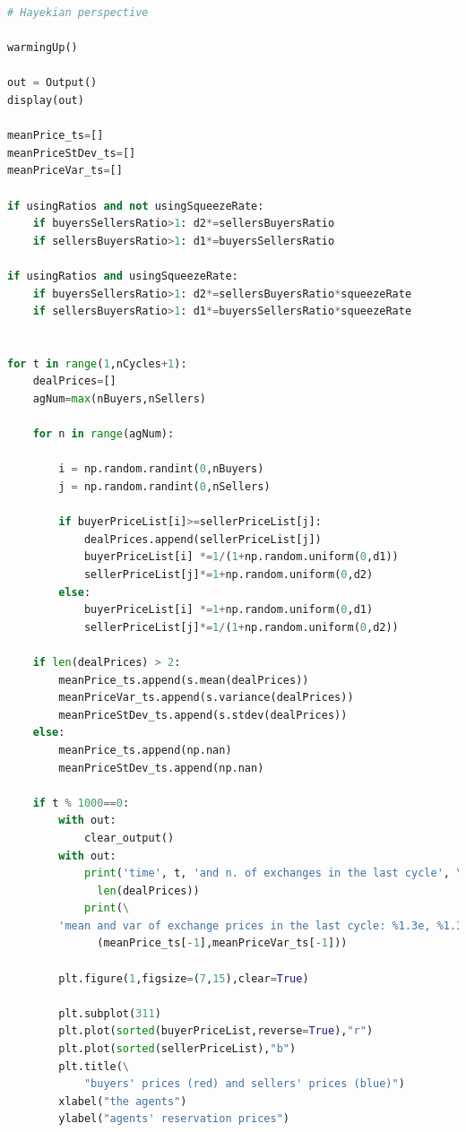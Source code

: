 \documentclass[10pt]{report}
\begin{document}
\begin{lstlisting}[language=Python, caption=The model in the simplified Hayekian perspective, label={The model in the simplified Hayekian perspective},basicstyle=\ttfamily\footnotesize]
# Hayekian perspective

warmingUp()

out = Output()
display(out)

meanPrice_ts=[]
meanPriceStDev_ts=[]
meanPriceVar_ts=[]

if usingRatios and not usingSqueezeRate:
    if buyersSellersRatio>1: d2*=sellersBuyersRatio
    if sellersBuyersRatio>1: d1*=buyersSellersRatio
        
if usingRatios and usingSqueezeRate:
    if buyersSellersRatio>1: d2*=sellersBuyersRatio*squeezeRate
    if sellersBuyersRatio>1: d1*=buyersSellersRatio*squeezeRate
    

for t in range(1,nCycles+1):    
    dealPrices=[]
    agNum=max(nBuyers,nSellers)

    for n in range(agNum):

        i = np.random.randint(0,nBuyers)
        j = np.random.randint(0,nSellers)
        
        if buyerPriceList[i]>=sellerPriceList[j]:
            dealPrices.append(sellerPriceList[j])
            buyerPriceList[i] *=1/(1+np.random.uniform(0,d1))
            sellerPriceList[j]*=1+np.random.uniform(0,d2)
        else:
            buyerPriceList[i] *=1+np.random.uniform(0,d1)
            sellerPriceList[j]*=1/(1+np.random.uniform(0,d2))
           
    if len(dealPrices) > 2:
        meanPrice_ts.append(s.mean(dealPrices))
        meanPriceVar_ts.append(s.variance(dealPrices))
        meanPriceStDev_ts.append(s.stdev(dealPrices))
    else:
        meanPrice_ts.append(np.nan)
        meanPriceStDev_ts.append(np.nan)

    if t % 1000==0:
        with out:
            clear_output()
        with out:
            print('time', t, 'and n. of exchanges in the last cycle', \
              len(dealPrices))
            print(\
        'mean and var of exchange prices in the last cycle: %1.3e, %1.3e' %\
              (meanPrice_ts[-1],meanPriceVar_ts[-1]))

        plt.figure(1,figsize=(7,15),clear=True)

        plt.subplot(311)
        plt.plot(sorted(buyerPriceList,reverse=True),"r")
        plt.plot(sorted(sellerPriceList),"b")
        plt.title(\
            "buyers' prices (red) and sellers' prices (blue)")
        xlabel("the agents")
        ylabel("agents' reservation prices")


\end{lstlisting}
\end{document}
